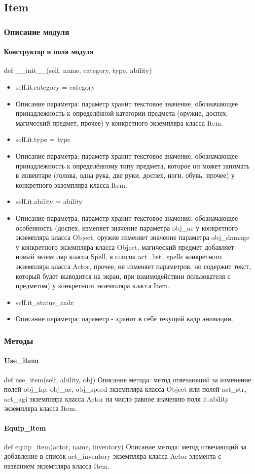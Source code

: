 \subsection{Item}
\subsubsection{Описание модуля}
\paragraph{Конструктор и поля модуля}
def \_\_init\_\_(self, name, category, type, ability)
\begin{itemize}
	\item self.it.category = category 
	\item Описание параметра: параметр хранит текстовое значение, обозначающее принадлежность к определённой категории предмета (оружие, доспех, магический предмет, прочее) у конкретного экземпляра класса Item.
	\item self.it.type = type 
	\item Описание параметра: параметр хранит текстовое значение, обозначающее принадлежность к определённому типу предмета, которое он может занимать в инвентаре (голова, одна рука, две руки, доспех, ноги, обувь, прочее) у конкретного экземпляра класса Item.
	\item self.it.ability = ability %
	\item Описание параметра: параметр хранит текстовое значение, обозначающее особенность (доспех, изменяет значение параметра obj\_ac у конкретного экземпляра класса Object, оружие изменяет значение параметра obj\_damage у конкретного экземпляра класса Object, магический предмет добавляет новый экземпляр класса Spell, в список act\_list\_spells конкретного экземпляра класса Actor, прочее, не изменяет параметров, но содержит текст, который будет выводится на экран, при взаимодействии пользователя с предметом) у конкретного экземпляра класса Item.
	\item self.it\_status\_cadr
	\item Описание параметра: параметр - хранит в себе текущий кадр анимации.
\end{itemize}
\subsubsection{Методы}
\paragraph{Use\_item}
def use\_item(self, ability, obj)
Описание метода: метод отвечающий за изменение полей obj\_hp, obj\_ac, obj\_speed экземпляра класса Object или полей act\_str, act\_agi экземпляра класса Actor на число равное значению поля it.ability экземпляра класса Item.
\paragraph{Equip\_item}
def equip\_item(actor, name, inventory)
Описание метода: метод отвечающий за добавление в список act\_inventory экземпляра класса Actor элемента с названием экземпляра класса Item.

